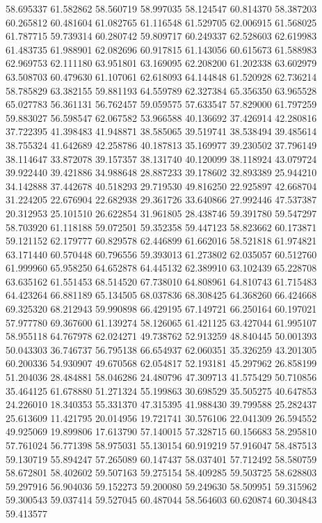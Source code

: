 58.695337
61.582862
58.560719
58.997035
58.124547
60.814370
58.387203
60.265812
60.481604
61.082765
61.116548
61.529705
62.006915
61.568025
61.787715
59.739314
60.280742
59.809717
60.249337
62.528603
62.619983
61.483735
61.988901
62.082696
60.917815
61.143056
60.615673
61.588983
62.969753
62.111180
63.951801
63.169095
62.208200
61.202338
63.602979
63.508703
60.479630
61.107061
62.618093
64.144848
61.520928
62.736214
58.785829
63.382155
59.881193
64.559789
62.327384
65.356350
63.965528
65.027783
56.361131
56.762457
59.059575
57.633547
57.829000
61.797259
59.883027
56.598547
62.067582
53.966588
40.136692
37.426914
42.280816
37.722395
41.398483
41.948871
38.585065
39.519741
38.538494
39.485614
38.755324
41.642689
42.258786
40.187813
35.169977
39.230502
37.796149
38.114647
33.872078
39.157357
38.131740
40.120099
38.118924
43.079724
39.922440
39.421886
34.988648
28.887233
39.178602
32.893389
25.944210
34.142888
37.442678
40.518293
29.719530
49.816250
22.925897
42.668704
31.224205
22.676904
22.682938
29.361726
33.640866
27.992446
47.537387
20.312953
25.101510
26.622854
31.961805
28.438746
59.391780
59.547297
58.703920
61.118188
59.072501
59.352358
59.447123
58.823662
60.173871
59.121152
62.179777
60.829578
62.446899
61.662016
58.521818
61.974821
63.171440
60.570448
60.796556
59.393013
61.273802
62.035057
60.512760
61.999960
65.958250
64.652878
64.445132
62.389910
63.102439
65.228708
63.635162
61.551453
68.514520
67.738010
64.808961
64.810743
61.715483
64.423264
66.881189
65.134505
68.037836
68.308425
64.368260
66.424668
69.325320
68.212943
59.990898
66.429195
67.149721
66.250164
60.197021
57.977780
69.367600
61.139274
58.126065
61.421125
63.427044
61.995107
58.955118
64.767978
62.024271
49.738762
52.913259
48.840445
50.001393
50.043303
36.746737
56.795138
66.654937
62.060351
35.326259
43.201305
60.200336
54.930907
49.670568
62.054817
52.193181
45.297962
26.858199
51.204036
28.484881
58.046286
24.480796
47.309713
41.575429
50.710856
35.464125
61.678880
51.271324
55.199863
30.698529
35.505275
40.647853
24.226010
18.340353
55.331370
47.315395
41.988430
39.799588
25.282437
25.613609
11.421795
20.014956
19.721741
30.576106
22.041309
26.594552
49.925069
19.899806
17.613790
57.140015
57.328715
60.156683
58.295810
57.761024
56.771398
58.975031
55.130154
60.919219
57.916047
58.487513
59.130719
55.894247
57.265089
60.147437
58.037401
57.712492
58.580759
58.672801
58.402602
59.507163
59.275154
58.409285
59.503725
58.628803
59.297916
56.904036
59.152273
59.200080
59.249630
58.509951
59.315962
59.300543
59.037414
59.527045
60.487044
58.564603
60.620874
60.304843
59.413577
